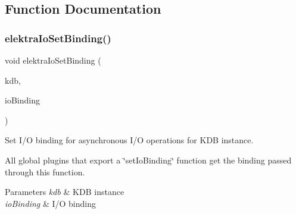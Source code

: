 \subsection{Function Documentation}
\mbox{\label{group__kdbio_ga187345483bdfbb404919c6797bc2db77}} 
\subsubsection{\texorpdfstring{elektraIoSetBinding()}{elektraIoSetBinding()}}
{\footnotesize\ttfamily void elektra\+Io\+Set\+Binding (\begin{DoxyParamCaption}\item[{K\+DB $\ast$}]{kdb,  }\item[{\mbox{\hyperlink{kdbio_8h_aabcd87b8c09d4d4c1033fc1baa417391}{Elektra\+Io\+Interface}} $\ast$}]{io\+Binding }\end{DoxyParamCaption})}



Set I/O binding for asynchronous I/O operations for K\+DB instance. 

All global plugins that export a \char`\"{}set\+Io\+Binding\char`\"{} function get the binding passed through this function.


\begin{DoxyParams}{Parameters}
{\em kdb} & K\+DB instance \\
\hline
{\em io\+Binding} & I/O binding \\
\hline
\end{DoxyParams}
